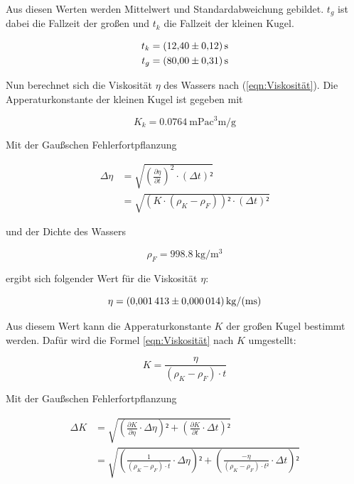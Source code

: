 Aus diesen Werten werden Mittelwert und Standardabweichung gebildet.
$t_g$ ist dabei die Fallzeit der großen und $t_k$ die Fallzeit der kleinen
Kugel.

\begin{align*}
t_k &= \SI{12.40+-0.12}{\second}\\
t_g &= \SI{80.00+-0.31}{\second}
\end{align*}

Nun berechnet sich die Viskosität $\eta$ des Wassers nach (\ref{eqn:Viskosität}).
Die Apperaturkonstante der kleinen Kugel ist gegeben mit 

\begin{equation*}
K_k = \SI{0.0764}{\milli\pascal\cubic\centi\meter\per\gram}
\end{equation*}

Mit der Gaußschen Fehlerfortpflanzung

\begin{align}
\Delta \eta &= \sqrt{\left(\frac{\partial\eta}{\partial t}\right)^2 \cdot \left(\Delta t\right)²}\\
&=\sqrt{\left(K\cdot(\rho_K - \rho_F)\right)²\cdot(\Delta t)²}
\end{align}

und der Dichte des Wassers 

\begin{equation}
\rho _F = \SI{998.8}{\kilo\gram\per\cubic\meter}
\end{equation}

ergibt sich folgender Wert für die Viskosität $\eta$:

\begin{equation*}
\eta = \SI{0.001413+-0.000014}{\kilo\gram\per(\meter\second)}
\end{equation*}

Aus diesem Wert kann die Apperaturkonstante $K$ der großen Kugel
bestimmt werden. Dafür wird die Formel \ref{eqn:Viskosität} nach 
$K$ umgestellt: 

\begin{equation*}
K = \frac{\eta}{(\rho_K - \rho_F) \cdot t}
\end{equation*}

Mit der Gaußschen Fehlerfortpflanzung

\begin{align*}
\Delta K &= \sqrt{\left(\frac{\partial K}{\partial \eta}\cdot \Delta\eta\right)² + \left(\frac{\partial K}{\partial t}\cdot \Delta t\right)²}\\
&= \sqrt{\left(\frac{1}{(\rho_K - \rho_F)\cdot t}\cdot \Delta\eta\right)² + \left(\frac{-\eta}{(\rho_K - \rho_F)\cdot t²}\cdot \Delta t\right)²}
\end{align*}

